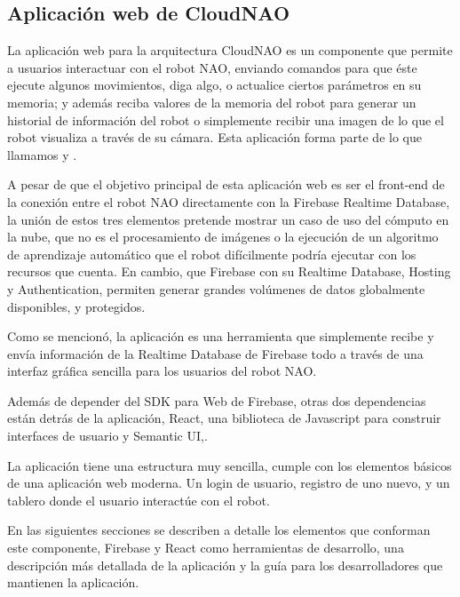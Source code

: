 
\subsection{Aplicación web de CloudNAO}
\label{\detokenize{nao_web:introduccion}}
La aplicación web para la arquitectura CloudNAO es un componente que permite a
usuarios interactuar con el robot NAO, enviando comandos para que éste ejecute
algunos movimientos, diga algo, o actualice ciertos parámetros en su memoria;
y además reciba valores de la memoria del robot para generar un historial
de información del robot o simplemente recibir una imagen de lo que el robot
visualiza a través de su cámara. Esta aplicación forma parte de lo que
llamamos  y .

A pesar de que el objetivo principal de esta aplicación web es ser el
front-end de la conexión entre el robot NAO directamente con la Firebase
Realtime Database, la unión de estos tres elementos pretende
mostrar un caso de uso del cómputo en la nube, que no es el procesamiento de
imágenes o la ejecución de un algoritmo de aprendizaje automático que el robot
difícilmente podría ejecutar con los recursos que cuenta. En cambio,
que Firebase con su Realtime Database, Hosting y Authentication, permiten
generar grandes volúmenes de datos globalmente disponibles, y protegidos.

Como se mencionó, la aplicación es una herramienta que simplemente recibe y envía información de la Realtime Database de
Firebase todo a través de una interfaz gráfica sencilla para los usuarios
del robot NAO.

Además de depender del SDK para Web de Firebase, otras dos dependencias están
detrás de la aplicación, React, una biblioteca de Javascript para construir
interfaces de usuario y Semantic UI,.

La aplicación tiene una estructura muy sencilla, cumple con los elementos
básicos de una aplicación web moderna. Un login de usuario, registro de uno
nuevo, y un tablero donde el usuario interactúe con el robot.

En las siguientes secciones se describen a detalle los elementos que conforman
este componente, Firebase y React como herramientas de desarrollo,
una descripción más detallada de la aplicación y la guía para
los desarrolladores que mantienen la aplicación.


